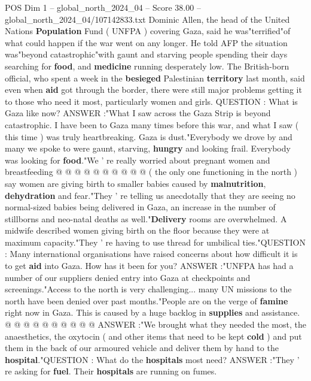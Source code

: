 \begin{textsample}{POS Dim 1 – global\_north\_2024\_04 – Score 38.00 – global\_north\_2024\_04/107142833.txt}  \label{ex:f1_pos_198}
Dominic Allen, the head of the United Nations \textbf{Population} Fund ( UNFPA ) covering Gaza, said he was"terrified"of what could happen if the war went on any longer.
He told AFP the situation was"beyond catastrophic"with gaunt and starving people spending their days searching for \textbf{food}, and \textbf{medicine} running desperately low.
The British-born official, who spent a week in the \textbf{besieged} Palestinian \textbf{territory} last month, said even when \textbf{aid} got through the border, there were still major problems getting it to those who need it most, particularly women and girls.
QUESTION : What is Gaza like now?
ANSWER :"What I saw across the Gaza Strip is beyond catastrophic.
I have been to Gaza many times before this war, and what I saw ( this time ) was truly heartbreaking.
Gaza is dust."Everybody we drove by and many we spoke to were gaunt, starving, \textbf{hungry} and looking frail.
Everybody was looking for \textbf{food}."We ' re really worried about pregnant women and breastfeeding @ @ @ @ @ @ @ @ @ @ ( the only one functioning in the north ) say women are giving birth to smaller babies caused by \textbf{malnutrition}, \textbf{dehydration} and fear."They ' re telling us anecdotally that they are seeing no normal-sized babies being delivered in Gaza, an increase in the number of stillborns and neo-natal deaths as well."\textbf{Delivery} rooms are overwhelmed.
A midwife described women giving birth on the floor because they were at maximum capacity."They ' re having to use thread for umbilical ties."QUESTION : Many international organisations have raised concerns about how difficult it is to get \textbf{aid} into Gaza.
How has it been for you?
ANSWER :"UNFPA has had a number of our suppliers denied entry into Gaza at checkpoints and screenings."Access to the north is very challenging... many UN missions to the north have been denied over past months."People are on the verge of \textbf{famine} right now in Gaza.
This is caused by a huge backlog in \textbf{supplies} and assistance. @ @ @ @ @ @ @ @ @ @ ANSWER :"We brought what they needed the most, the anaesthetics, the oxytocin ( and other items that need to be kept \textbf{cold} ) and put them in the back of our armoured vehicle and deliver them by hand to the \textbf{hospital}."QUESTION : What do the \textbf{hospitals} most need?
ANSWER :"They ' re asking for \textbf{fuel}.
Their \textbf{hospitals} are running on fumes.

\end{textsample}
